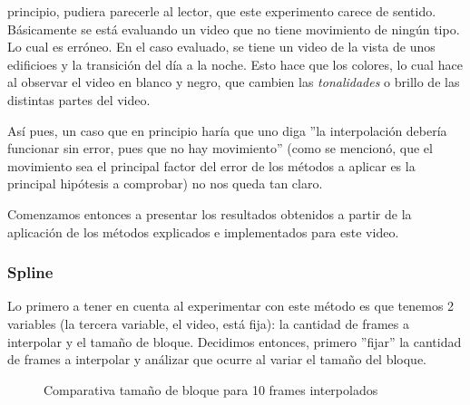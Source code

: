  principio, pudiera parecerle al lector, que este experimento
carece de sentido. B\'asicamente se est\'a evaluando un video que no tiene
movimiento de ning\'un tipo. Lo cual es err\'oneo. En el caso evaluado, se tiene
un video de la vista de unos edificioes y la transici\'on del d\'ia a la noche.
Esto hace que los colores, lo cual hace al observar el video en blanco y negro,
que cambien las \emph{tonalidades} o brillo de las distintas partes del video.

\par As\'i pues, un caso que en principio har\'ia que uno diga ''la
interpolaci\'on deber\'ia funcionar sin error, pues que no hay movimiento''
(como se mencion\'o, que el movimiento sea el principal factor del error de los
m\'etodos a aplicar es la principal hip\'otesis a comprobar) no nos queda tan
claro.

\par Comenzamos entonces a presentar los resultados obtenidos a partir de la
aplicaci\'on de los m\'etodos explicados e implementados para este video.

\subsubsection{Spline}\label{subsubsec:fija-fija_spline}
\par Lo primero a tener en cuenta al experimentar con este m\'etodo es que
tenemos 2 variables (la tercera variable, el video, est\'a fija): la cantidad
de frames a interpolar y el tama\~no de bloque. Decidimos entonces, primero
''fijar'' la cantidad de frames a interpolar y an\'alizar que ocurre al variar
el tama\~no del bloque.

\begin{figure}[H]
    \centering
    \caption{Comparativa tama\~no de bloque para 10 frames interpolados}
    \label{fig:fija-fija_spline-bloques}
\end{figure}

